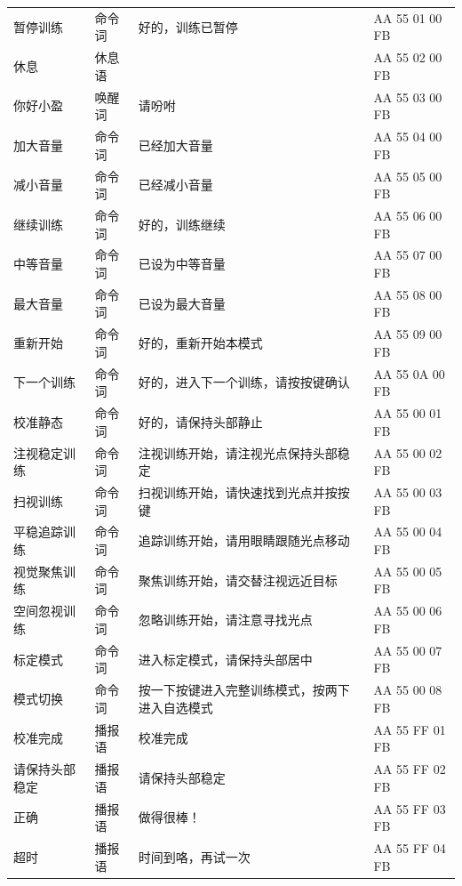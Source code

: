 \begin{longtable}{p{2.5cm} p{2.2cm} p{5.5cm} p{3.5cm}}
暂停训练   & 命令词   & 好的，训练已暂停                 & AA 55 01 00 FB  \\
休息       & 休息语   &                                  & AA 55 02 00 FB  \\
你好小盈   & 唤醒词   & 请吩咐                           & AA 55 03 00 FB  \\
加大音量   & 命令词   & 已经加大音量                     & AA 55 04 00 FB  \\
减小音量   & 命令词   & 已经减小音量                     & AA 55 05 00 FB  \\
继续训练   & 命令词   & 好的，训练继续                   & AA 55 06 00 FB  \\
中等音量   & 命令词   & 已设为中等音量                   & AA 55 07 00 FB  \\
最大音量   & 命令词   & 已设为最大音量                   & AA 55 08 00 FB  \\
重新开始   & 命令词   & 好的，重新开始本模式             & AA 55 09 00 FB  \\
下一个训练 & 命令词   & 好的，进入下一个训练，请按按键确认 & AA 55 0A 00 FB  \\
校准静态   & 命令词   & 好的，请保持头部静止             & AA 55 00 01 FB  \\
注视稳定训练   & 命令词   & 注视训练开始，请注视光点保持头部稳定 & AA 55 00 02 FB  \\
扫视训练   & 命令词   & 扫视训练开始，请快速找到光点并按按键 & AA 55 00 03 FB  \\
平稳追踪训练   & 命令词   & 追踪训练开始，请用眼睛跟随光点移动 & AA 55 00 04 FB  \\
视觉聚焦训练   & 命令词   & 聚焦训练开始，请交替注视远近目标 & AA 55 00 05 FB  \\
空间忽视训练   & 命令词   & 忽略训练开始，请注意寻找光点     & AA 55 00 06 FB  \\
标定模式   & 命令词   & 进入标定模式，请保持头部居中     & AA 55 00 07 FB  \\
模式切换   & 命令词   & 按一下按键进入完整训练模式，按两下进入自选模式 & AA 55 00 08 FB  \\
校准完成   & 播报语   & 校准完成                         & AA 55 FF 01 FB  \\
请保持头部稳定 & 播报语 & 请保持头部稳定                   & AA 55 FF 02 FB  \\
正确       & 播报语   & 做得很棒！                       & AA 55 FF 03 FB  \\
超时       & 播报语   & 时间到咯，再试一次               & AA 55 FF 04 FB  \\

\end{longtable}
